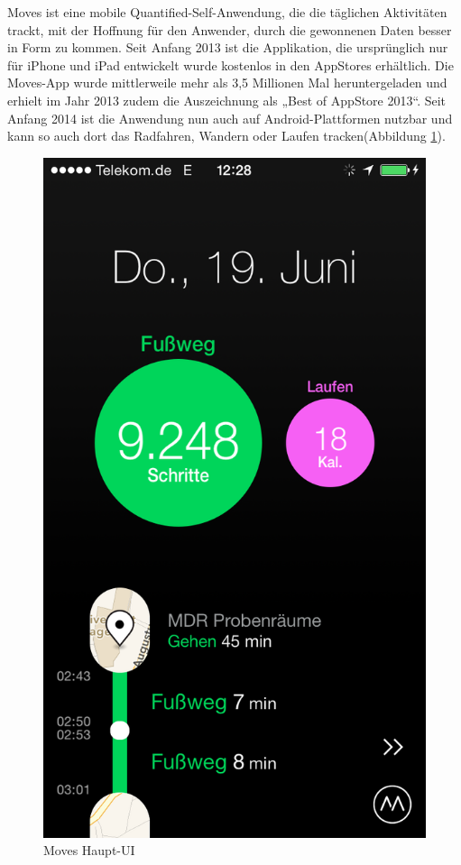 Moves ist eine mobile Quantified-Self-Anwendung, die die täglichen Aktivitäten trackt, mit der Hoffnung für den Anwender, durch die gewonnenen Daten besser in Form zu kommen. 
Seit Anfang 2013 ist die Applikation, die ursprünglich nur für iPhone und iPad entwickelt wurde kostenlos in den AppStores erhältlich. 
Die Moves-App wurde mittlerweile mehr als 3,5 Millionen Mal heruntergeladen und erhielt im Jahr 2013 zudem die Auszeichnung als „Best of AppStore 2013“.\cite{web:MovesApp}
Seit Anfang 2014 ist die Anwendung nun auch auf Android-Plattformen nutzbar und kann so auch dort das Radfahren, Wandern oder Laufen tracken(Abbildung \ref{fig:Haupt-UI}).

\begin{figure}[H]
 \centering
 \includegraphics[scale=0.3]{images/moves-app-main-ui.PNG}
 \caption{Moves Haupt-UI \cite{fig:Haupt-UI}}
 \label{fig:Haupt-UI}
\end{figure}

